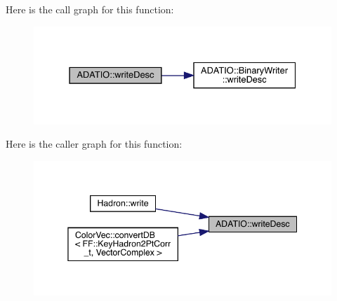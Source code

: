 Here is the call graph for this function\+:\nopagebreak
\begin{figure}[H]
\begin{center}
\leavevmode
\includegraphics[width=331pt]{d0/dba/namespaceADATIO_a0faeed900aacb29febaa709323135c50_cgraph}
\end{center}
\end{figure}
Here is the caller graph for this function\+:\nopagebreak
\begin{figure}[H]
\begin{center}
\leavevmode
\includegraphics[width=345pt]{d0/dba/namespaceADATIO_a0faeed900aacb29febaa709323135c50_icgraph}
\end{center}
\end{figure}
